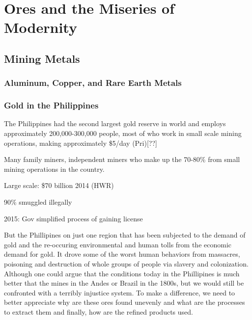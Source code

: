 \chapter{Ores and the Miseries of Modernity}


\section{Mining Metals}

\subsection{Aluminum, Copper, and Rare Earth Metals}


\subsection{Gold in the Philippines}

The Philippines had the second largest gold reserve in world and employs approximately 200,000-300,000 people, most of who work in small scale mining operations, making approximately \$5/day (Pri)[??]

Many family miners, independent miners who make up the 70-80\% from small mining operations in the country. 


Large scale: \$70 billion 2014 (HWR)

90\% smuggled illegally

2015: Gov simplified process of gaining license 

But the Phillipines on just one region that has been subjected to the demand of gold and the re-occuring environmental and human tolls from the economic demand for gold. It drove some of the worst human behaviors from massacres, poisoning and destruction of whole groups of people via slavery and colonization. Although one could argue that the conditions today in the Phillipines is much better that the mines in the Andes or Brazil in the 1800s, but we would still be confronted with a terribly injustice system. To make a difference, we need to better appreciate why are these ores found unevenly and what are the processes to extract them and finally, how are the refined products used. 


